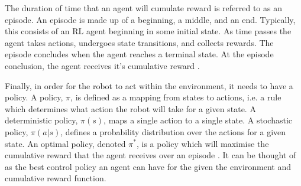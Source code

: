 The duration of time that an agent will cumulate reward is referred to as an episode. An episode is made up of a beginning, a middle, and an end. Typically, this consists of an RL agent beginning in some initial state. As time passes the agent takes actions, undergoes state transitions, and collects rewards. The episode concludes when the agent reaches a terminal state. At the episode conclusion, the agent receives it's cumulative reward \cite{Kaelbling1996}.

Finally, in order for the robot to act within the environment, it needs to have a policy. A policy, $\pi$, is defined as a mapping from states to actions, i.e. a rule which determines what action the robot will take for a given state. A deterministic policy, $\pi (s)$, maps a single action to a single state. A stochastic policy, $\pi (a | s)$, defines a probability distribution over the actions for a given state. An optimal policy, denoted $\pi^*$, is a policy which will maximise the cumulative reward that the agent receives over an episode \cite{Bellm1954}. It can be thought of as the best control policy an agent can have for the given the environment and cumulative reward function.

